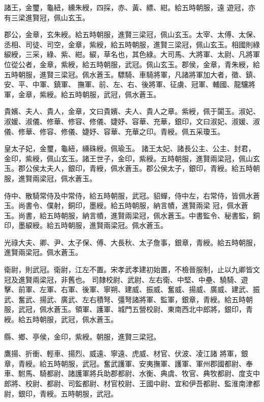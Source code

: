 \begin{pinyinscope}
 諸王，金璽，龜紐，纁朱綬，四採，赤、黃、縹、紺。給五時朝服，遠
 遊冠，亦有三梁進賢冠，佩山玄玉。



 郡公，金章，玄朱綬。給五時朝服，進賢三梁冠，佩山玄玉。太宰、太傅、太保、丞相、司徒、司空，金章，紫綬，給五時朝服，進賢三梁冠，佩山玄玉。相國則綠綟綬，三采，綠、紫、紺。綟，草名也，其色綠。大司馬、大將軍、太尉、凡將軍位從公者，金章，紫綬，給五時朝服，武冠。佩山玄玉。郡侯，金章，青朱綬，給五時朝服，進賢三梁冠。佩水蒼玉。驃騎、車騎將軍，凡諸將軍加大者，徵、鎮、安、平、中軍、鎮軍、
 撫軍、前、左、右、後將軍、征虜、冠軍、輔國、龍驤將軍，金章，紫綬。給五時朝服，武冠，佩水蒼玉。



 貴嬪、夫人、貴人，金章，文曰貴嬪、夫人、貴人之章。紫綬，佩于闐玉。淑妃、淑媛、淑儀、修華、修容、修儀、婕妤、容華、充華，銀印，文曰淑妃、淑媛、淑儀、修華、修容、修儀、婕妤、容華、充華之印。青綬。佩五采瓊玉。



 皇太子妃，金璽，龜紐，纁硃綬。佩瑜玉。
 諸王太妃、諸長公主、公主、封君，金印，紫綬，佩山玄玉。諸王世子，金印，紫綬。五時朝服，進賢兩梁冠，佩山玄玉。郡公侯太夫人，銀印，青綬，佩水蒼玉。郡公侯太子，銀印，青綬。給五時朝服，進賢兩梁冠，佩水蒼玉。



 侍中、散騎常侍及中常侍，給五時朝服，武冠。貂蟬，侍中左，右常侍，皆佩水蒼玉。尚書令、僕射，銅印，墨綬。給五時朝服，納言幘，進賢兩梁
 冠，佩水蒼玉。尚書，給五時朝服，納言幘，進賢兩梁冠，佩水蒼玉。中書監令、秘書監，銅印，墨綟綬。給五時朝服，進賢兩梁冠。佩水蒼玉。



 光祿大夫、卿、尹、太子保、傅、大長秋、太子詹事，銀章，青綬。給五時朝服，進賢兩梁冠。佩水蒼玉。



 衛尉，則武冠。衛尉，江左不置。宋孝武孝建初始置，不檢晉服制，止以九卿皆文冠及進賢兩梁冠，非舊也。
 司隸校尉、武尉、左右衛、中堅、中壘、驍騎、遊擊、前軍、左軍、右軍、後軍、寧朔、建威、振威、奮威、揚威、廣威、建武、振武、奮武、揚武、廣武、左右積弩、彊弩諸將軍、監軍，銀章，青綬。給五時朝服，武冠，佩水蒼玉。領軍、護軍、城門五營校尉、東南西北中郎將，銀印，青綬。給五時朝服，武冠，佩水蒼玉。



 縣、鄉、亭侯，金印，紫綬。朝服，進賢三梁冠。



 鷹揚、折衝、輕車、揚烈、威遠、寧遠、虎威、材官、伏波、凌江諸
 將軍，銀章，青綬。給五時朝服，武冠。奮武護軍、安夷撫軍、護軍、軍州郡國都尉、奉車、駙馬、騎都尉、諸護軍將兵助郡都尉、水衡、典虞、牧官、典牧都尉、度支中郎將、校尉、都尉、司監都尉、材官校尉、王國中尉、宜和伊吾都尉、監淮南津都尉，銀印，青綬。五時朝服，武冠。




\end{pinyinscope}
